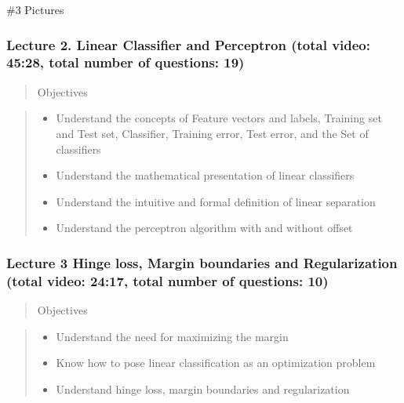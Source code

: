 \documentclass[]{article}
\providecommand{\tightlist}{%
  \setlength{\itemsep}{0pt}\setlength{\parskip}{0pt}}
\begin{document}
\#3 Pictures

\hypertarget{lecture-2.-linear-classifier-and-perceptron-total-video-4528-total-number-of-questions-19}{%
\subsubsection{Lecture 2. Linear Classifier and Perceptron (total video:
45:28, total number of questions:
19)}\label{lecture-2.-linear-classifier-and-perceptron-total-video-4528-total-number-of-questions-19}}

\begin{quote}
Objectives
\end{quote}

\begin{quote}
\begin{itemize}
\tightlist
\item
  Understand the concepts of Feature vectors and labels, Training set
  and Test set, Classifier, Training error, Test error, and the Set of
  classifiers
\item
  Understand the mathematical presentation of linear classifiers
\item
  Understand the intuitive and formal definition of linear separation
\item
  Understand the perceptron algorithm with and without offset
\end{itemize}
\end{quote}

\hypertarget{lecture-3-hinge-loss-margin-boundaries-and-regularization-total-video-2417-total-number-of-questions-10}{%
\subsubsection{Lecture 3 Hinge loss, Margin boundaries and
Regularization (total video: 24:17, total number of questions:
10)}\label{lecture-3-hinge-loss-margin-boundaries-and-regularization-total-video-2417-total-number-of-questions-10}}

\begin{quote}
Objectives
\end{quote}

\begin{quote}
\begin{itemize}
\tightlist
\item
  Understand the need for maximizing the margin
\item
  Know how to pose linear classification as an optimization problem
\item
  Understand hinge loss, margin boundaries and regularization
\end{itemize}
\end{quote}
\end{document}
